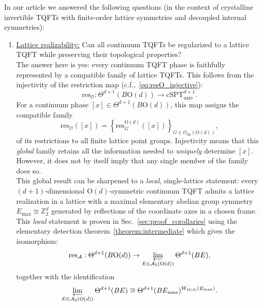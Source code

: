 \documentclass[aps,prx,reprint,superscriptaddress,twocolumn,amsmath,amssymb,amsfonts, nofootinbib]{revtex4-2}
\newcommand{\csptu}{\mathrm{cSPT}^{d+1}_{\mathrm{univ}}}
\newcommand{\ofin}{\mathcal{O}_{\text{fin}}}
\newcommand{\res}{\text{res}}
\newcommand{\Z}{\mathbb{Z}}
\theoremstyle{apsstyle}
\begin{document}
In our article we answered the following questions (in the context of crystalline invertible TQFTs with finite-order lattice symmetries and decoupled internal symmetries): 
\begin{enumerate}
    \item \underline{Lattice realizability:} Can all continuum TQFTs be regularized to a lattice TQFT while preserving their topological properties?\\
    The answer here is yes: every continuum TQFT phase is faithfully represented by a compatible family of lattice TQFTs. This follows from the injectivity of the restriction map (c.f.,~\eqref{eq:resO_injective}):
    \begin{equation*}
        \res_{\mathcal{O}}: \Theta^{d+1}(B\mathrm{O}(d)) \to \csptu.
    \end{equation*}
    For a continuum phase $[x]\in\Theta^{d+1}(B\mathrm{O}(d))$, this map assigns the compatible family
    \begin{equation*}
    \res_{\mathcal O}([x]) = \left\{ \res^{\mathrm{O}(d)}_G([x])
    \right\}_{G\in\ofin(\mathrm{O}(d))},
    \end{equation*}
    of its restrictions to all finite lattice point groups. Injectivity means that this \textit{global} family retains all the information needed to \textit{uniquely} determine $[x]$. However, it does not by itself imply that any single member of the family does so.\\
    This global result can be sharpened to a \textit{local}, single-lattice statement: every $(d+1)$-dimensional $\mathrm{O}(d)$-symmetric continuum TQFT admits a lattice realization in a lattice with a maximal elementary abelian group symmetry $E_{\mathrm{max}}\cong \Z_{2}^{d}$ generated by reflections of the coordinate axes in a chosen frame.
    This \textit{local} statement is proven in Sec.~\ref{sec:proof_corollaries} using the elementary detection theorem~\ref{theorem:intermediate} which gives the isomorphism: 
    \begin{equation}
        \res_{\mathcal{A}}: \Theta^{d+1}(B\mathrm{O}(d)) \to \varprojlim_{E\in \mathcal{A}_{2}(\mathrm{O}(d))} \Theta^{d+1}(BE),
        \label{eq:disc1}
    \end{equation}
    together with the identification
    \begin{equation}
        \varprojlim_{E\in \mathcal{A}_{2}(\mathrm{O}(d))} \Theta^{d+1}(BE)\cong  \Theta^{d+1}(BE_{\mathrm{max}})^{W_{\mathrm{O}(d)}(E_{\mathrm{max}})}.
        \label{eq:disc2}
    \end{equation} 

\end{enumerate}
\end{document}
